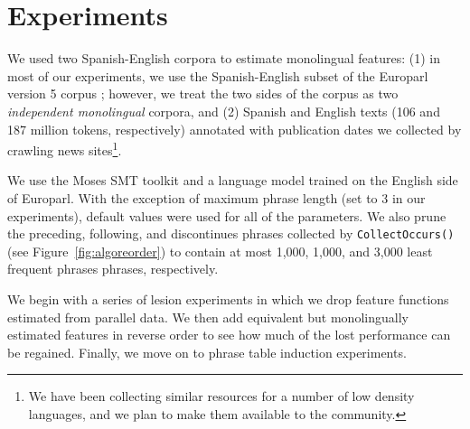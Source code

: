 \documentclass[11pt]{article}
\newcommand{\mnote}[1]{\marginpar{%
  \vskip-\baselineskip
  \raggedright\footnotesize
  \itshape\hrule\smallskip\tiny{#1}\par\smallskip\hrule}}
\newcommand{\mtodo}[1]{\mnote{\textcolor{red}{#1}}}
\newcommand{\todo}[1]{\textcolor{red}{TODO: #1}}
\newcommand{\figref}[1]{Figure~\ref{#1}}
\begin{document}



\section{Experiments} \label{sect:exp}

We used two Spanish-English corpora to estimate monolingual features: (1) in most of our experiments, we use the Spanish-English subset of the Europarl version 5 corpus \cite{Koehn:2005}; however, we treat the two sides of the corpus as two {\em independent monolingual} corpora, and (2)  Spanish and English texts (106 and 187 million tokens, respectively) annotated with publication dates we collected by crawling news sites\footnote{We have been collecting similar resources for a number of low density languages, and we plan to make them available to the community.}.

We use the Moses SMT toolkit\mtodo{Add a moses citation} and a language model trained on the English side of Europarl.  With the exception of maximum phrase length (set to 3 in our experiments\mtodo{Add the phrase length vs. performance curve?}), default values were used for all of the parameters.  We also prune the preceding, following, and discontinues phrases collected by {\tt \small CollectOccurs()} (see \figref{fig:algoreorder}) to contain at most 1,000, 1,000, and 3,000 least frequent phrases phrases, respectively.

We begin with a series of lesion experiments in which we drop feature functions estimated from parallel data.  We then add equivalent but monolingually estimated features in reverse order to see how much of the lost performance can be regained.  Finally, we move on to phrase table induction experiments.
\end{document}
